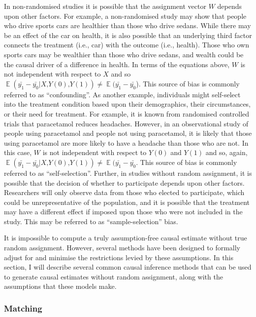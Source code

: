 \documentclass[12pt]{article}
\DeclareMathOperator{\E}{\mathbb{E}}
\newcommand{\mc}{\textrm{,}}
\DeclareMathOperator{\E}{\mathbb{E}}
\newcommand{\mc}{\textrm{,}}
\begin{document}
In non-randomised studies it is possible that the assignment vector $W$ depends upon other factors. For example, a non-randomised study may show that people who drive sports cars are healthier than those who drive sedans. While there may be an effect of the car on health, it is also possible that an underlying third factor connects the treatment (i.e., car) with the outcome (i.e., health). Those who own sports cars may be wealthier than those who drive sedans, and wealth could be the causal driver of a difference in health. In terms of the equations above, $W$ is not independent with respect to $X$ and so $\E(\bar{y_1} - \bar{y_0}|X \mc Y(0) \mc Y(1)) \neq \E(\bar{y_1} - \bar{y_0}$). This source of bias is commonly referred to as ``confounding''. As another example, individuals might self-select into the treatment condition based upon their demographics, their circumstances, or their need for treatment. For example, it is known from randomised controlled trials that paracetamol reduces headaches. However, in an observational study of people using paracetamol and people not using paracetamol, it is likely that those using paracetamol are more likely to have a headache than those who are not. In this case, $W$ is not independent with respect to $Y(0)$ and $Y(1)$ and so, again, $\E(\bar{y_1} - \bar{y_0}|X \mc Y(0) \mc Y(1)) \neq \E(\bar{y_1} - \bar{y_0}$. This source of bias is commonly referred to as ``self-selection''. Further, in studies without random assignment, it is possible that the decision of whether to participate depends upon other factors. Researchers will only observe data from those who elected to participate, which could be unrepresentative of the population, and it is possible that the treatment may have a different effect if imposed upon those who were not included in the study. This may be referred to as ``sample-selection'' bias.

It is impossible to compute a truly assumption-free causal estimate without true random assignment. However, several methods have been designed to formally adjust for and minimise the restrictions levied by these assumptions. In this section, I will describe several common causal inference methods that can be used to generate causal estimates without random assignment, along with the assumptions that these models make.

\subsubsection{Matching}
\end{document}

